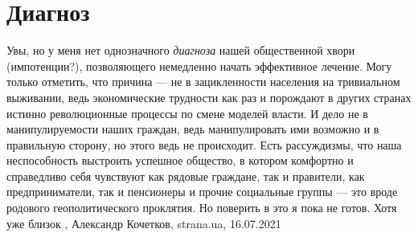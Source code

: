  
 
 
 
 
\chapter{Диагноз}

Увы, но у меня нет однозначного \emph{диагноза} нашей общественной хвори
(импотенции?), позволяющего немедленно начать эффективное лечение. Могу только
отметить, что причина — не в зацикленности населения на тривиальном выживании,
ведь экономические трудности как раз и порождают в других странах истинно
революционные процессы по смене моделей власти. И дело не в манипулируемости
наших граждан, ведь манипулировать ими возможно и в правильную сторону, но
этого ведь не происходит.  Есть рассуждизмы, что наша неспособность выстроить
успешное общество, в котором комфортно и справедливо себя чувствуют как рядовые
граждане, так и правители, как предприниматели, так и пенсионеры и прочие
социальные группы — это вроде родового геополитического проклятия. Но поверить
в это я пока не готов. Хотя уже близок
, 
Александр Кочетков, strana.ua, 16.07.2021

